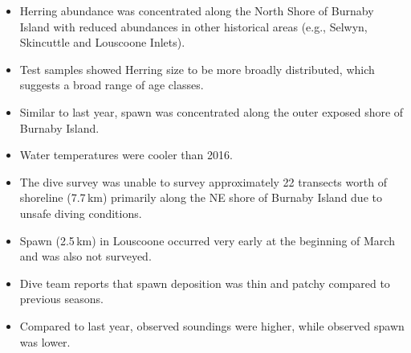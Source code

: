 \begin{itemize}
\item Herring abundance was concentrated along the North Shore of Burnaby Island with reduced abundances in other historical areas (e.g., Selwyn, Skincuttle and Louscoone Inlets).
\item Test samples showed Herring size to be more broadly distributed, which suggests a broad range of age classes.
\item Similar to last year, spawn was concentrated along the outer exposed shore of Burnaby Island.
\item Water temperatures were cooler than 2016.
\item The dive survey was unable to survey approximately 22 transects worth of shoreline (7.7\,km) primarily along the NE shore of Burnaby Island due to unsafe diving conditions.
\item Spawn (2.5\,km) in Louscoone occurred very early at the beginning of March and was also not surveyed.
\item Dive team reports that spawn deposition was thin and patchy compared to previous seasons.
\item Compared to last year, observed soundings were higher, while observed spawn was lower.
\end{itemize}